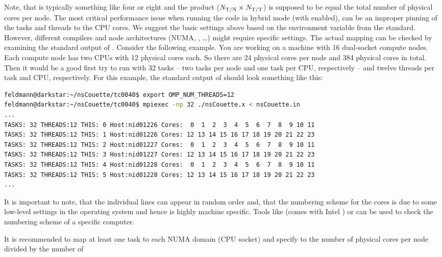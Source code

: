 \documentclass[a4paper, 11pt, DIV=11]{scrartcl}
\begin{document}
Note, that \tpn is typically something like four or eight and the product ($N_{\text{T/N}}\times N_{\text{T/T}}$) is
supposed to be equal the total number of physical cores per node. The most critical performance
issue when running the code in hybrid mode (\ie with \omp enabled), can be an improper pinning
of the \mpi tasks and \omp threads to the CPU cores. We suggest the basic settings above based
on the  environment variable from the
\omp standard. However, different compilers and node architectures (NUMA, \hyperthreading,
\dots) might require specific settings. The actual mapping can be checked by examining the
standard output of \nsc. Consider the following example. You are working on a machine with
\num{16} dual-socket compute nodes. Each compute node has two CPUs with \num{12} physical
cores each. So there are \num{24} physical cores per node and \num{384} physical cores in
total. Then it would be a good first try to run \nsc with \num{32} \mpi tasks -- \ie two tasks
per node and one task per CPU, respectively -- and twelve \omp threads per \mpi task and CPU,
respectively. For this example, the standard output of \nsc should look something like this:
\begin{lstlisting}[language=bash]
feldmann@darkstar:~/nsCouette/tc0040$ export OMP_NUM_THREADS=12
feldmann@darkstar:~/nsCouette/tc0040$ mpiexec -np 32 ./nsCouette.x < nsCouette.in
...
TASKS: 32 THREADS:12 THIS: 0 Host:nid01226 Cores:  0  1  2  3  4  5  6  7  8  9 10 11
TASKS: 32 THREADS:12 THIS: 1 Host:nid01226 Cores: 12 13 14 15 16 17 18 19 20 21 22 23
TASKS: 32 THREADS:12 THIS: 2 Host:nid01227 Cores:  0  1  2  3  4  5  6  7  8  9 10 11
TASKS: 32 THREADS:12 THIS: 3 Host:nid01227 Cores: 12 13 14 15 16 17 18 19 20 21 22 23
TASKS: 32 THREADS:12 THIS: 4 Host:nid01228 Cores:  0  1  2  3  4  5  6  7  8  9 10 11
TASKS: 32 THREADS:12 THIS: 5 Host:nid01228 Cores: 12 13 14 15 16 17 18 19 20 21 22 23
...
\end{lstlisting}
It is important to note, that the individual lines can appear in random order and, that the
numbering scheme for the cores is due to some low-level settings in the operating system and
hence is highly machine specific. Tools like  (comes with Intel \mpi) or
\href{http://code.google.com/p/likwid}{} can be used to check the
numbering scheme of a specific computer.
\par
It is recommended to map at least one \mpi task to each NUMA domain (CPU socket) and specify
 to the number of physical cores per node divided by the number of \mpi
\end{document}
